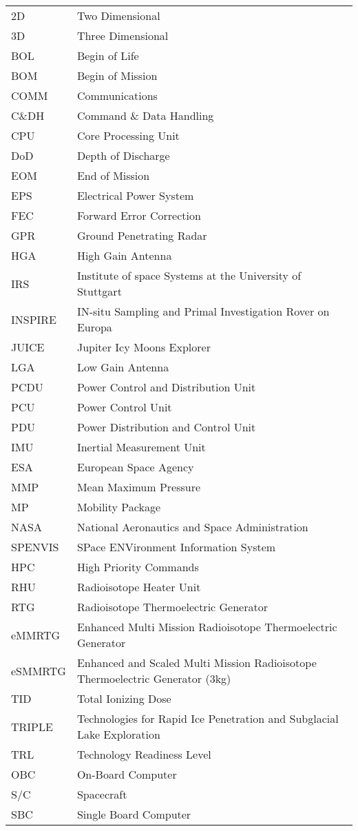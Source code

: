 \begin{longtable}[l]{ll}

2D		& Two Dimensional \\
3D		& Three Dimensional \\
BOL     & Begin of Life \\
BOM     & Begin of Mission \\
COMM    & Communications \\
C\&DH	& Command \& Data Handling \\
CPU		& Core Processing Unit \\
DoD     & Depth of Discharge \\
EOM     & End of Mission \\
EPS     & Electrical Power System \\
FEC		& Forward Error Correction \\
GPR		& Ground Penetrating Radar \\
HGA	    & High Gain Antenna \\
IRS     & Institute of space Systems at the University of Stuttgart \\
INSPIRE & IN-situ Sampling and Primal Investigation Rover on Europa \\
JUICE 	& Jupiter Icy Moons Explorer \\
LGA		& Low Gain Antenna \\		
PCDU    & Power Control and Distribution Unit \\
PCU     & Power Control Unit \\
PDU     & Power Distribution and Control Unit \\
IMU     & Inertial Measurement Unit \\
ESA		& European Space Agency	\\
MMP		& Mean Maximum Pressure \\
MP		& Mobility Package \\
NASA    &   National Aeronautics and Space Administration \\
SPENVIS	&	SPace ENVironment Information System	\\
HPC     & High Priority Commands \\
RHU		& Radioisotope Heater Unit\\
RTG     & Radioisotope Thermoelectric Generator \\
eMMRTG  & Enhanced Multi Mission Radioisotope Thermoelectric Generator \\
eSMMRTG & Enhanced and Scaled Multi Mission Radioisotope Thermoelectric Generator (3kg) \\
TID		& Total Ionizing Dose \\
TRIPLE 	& Technologies for Rapid Ice Penetration and Subglacial Lake Exploration \\
TRL     & Technology Readiness Level \\
OBC		& On-Board Computer \\
S/C     & Spacecraft\\
SBC		& Single Board Computer \\



\end{longtable}

